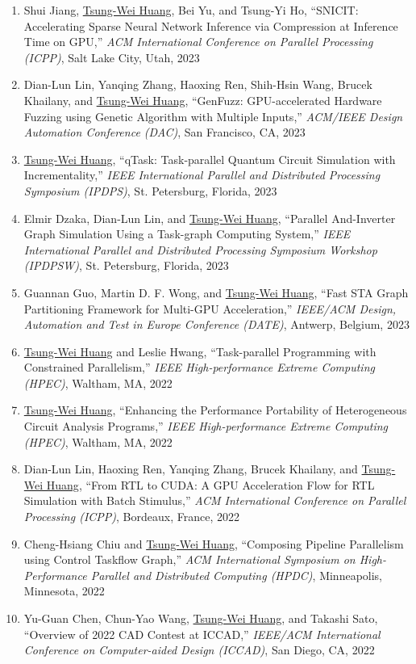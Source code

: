 \documentclass[A4,11pt]{article}
\begin{document}
\begin{enumerate}
    \item Shui Jiang, \underline{Tsung-Wei Huang}, Bei Yu, and Tsung-Yi Ho, ``SNICIT: Accelerating Sparse Neural Network Inference via Compression at Inference Time on GPU,'' \textit{ACM International Conference on Parallel Processing (ICPP)}, Salt Lake City, Utah, 2023
    \item Dian-Lun Lin, Yanqing Zhang, Haoxing Ren, Shih-Hsin Wang, Brucek Khailany, and \underline{Tsung-Wei Huang}, ``GenFuzz: GPU-accelerated Hardware Fuzzing using Genetic Algorithm with Multiple Inputs,'' \textit{ACM/IEEE Design Automation Conference (DAC)}, San Francisco, CA, 2023
    \item \underline{Tsung-Wei Huang}, ``qTask: Task-parallel Quantum Circuit Simulation with Incrementality,'' \textit{IEEE International Parallel and Distributed Processing Symposium (IPDPS)}, St. Petersburg, Florida, 2023 
    \item Elmir Dzaka, Dian-Lun Lin, and \underline{Tsung-Wei Huang}, ``Parallel And-Inverter Graph Simulation Using a Task-graph Computing System,'' \textit{IEEE International Parallel and Distributed Processing Symposium Workshop (IPDPSW)}, St. Petersburg, Florida, 2023 
    \item Guannan Guo, Martin D. F. Wong, and \underline{Tsung-Wei Huang}, ``Fast STA Graph Partitioning Framework for Multi-GPU Acceleration,'' \textit{IEEE/ACM Design, Automation and Test in Europe Conference (DATE)}, Antwerp, Belgium, 2023
    \item \underline{Tsung-Wei Huang} and Leslie Hwang, ``Task-parallel Programming with Constrained Parallelism,'' \textit{IEEE High-performance Extreme Computing (HPEC)}, Waltham, MA, 2022
    \item \underline{Tsung-Wei Huang}, ``Enhancing the Performance Portability of Heterogeneous Circuit Analysis Programs,'' \textit{IEEE High-performance Extreme Computing (HPEC)}, Waltham, MA, 2022
    \item Dian-Lun Lin, Haoxing Ren, Yanqing Zhang, Brucek Khailany, and \underline{Tsung-Wei Huang}, ``From RTL to CUDA: A GPU Acceleration Flow for RTL Simulation with Batch Stimulus,'' \textit{ACM International Conference on Parallel Processing (ICPP)}, Bordeaux, France, 2022
    \item Cheng-Hsiang Chiu and \underline{Tsung-Wei Huang}, ``Composing Pipeline Parallelism using Control Taskflow Graph,'' \textit{ACM International Symposium on High-Performance Parallel and Distributed Computing (HPDC)}, Minneapolis, Minnesota, 2022
    \item Yu-Guan Chen, Chun-Yao Wang, \underline{Tsung-Wei Huang}, and Takashi Sato, ``Overview of 2022 CAD Contest at ICCAD,'' \textit{IEEE/ACM International Conference on Computer-aided Design (ICCAD)}, San Diego, CA, 2022

\end{enumerate}
\end{document}
